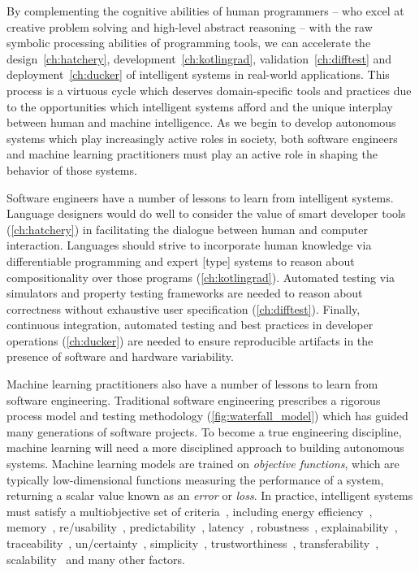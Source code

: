 By complementing the cognitive abilities of human programmers -- who excel at creative problem solving and high-level abstract reasoning -- with the raw symbolic processing abilities of programming tools, we can accelerate the design~\autoref{ch:hatchery}, development~\autoref{ch:kotlingrad}, validation~\autoref{ch:difftest} and deployment~\autoref{ch:ducker} of intelligent systems in real-world applications. This process is a virtuous cycle which deserves domain-specific tools and practices due to the opportunities which intelligent systems afford and the unique interplay between human and machine intelligence. As we begin to develop autonomous systems which play increasingly active roles in society, both software engineers and machine learning practitioners must play an active role in shaping the behavior of those systems.

Software engineers have a number of lessons to learn from intelligent systems. Language designers would do well to consider the value of smart developer tools (\autoref{ch:hatchery}) in facilitating the dialogue between human and computer interaction. Languages should strive to incorporate human knowledge via differentiable programming and expert [type] systems to reason about compositionality over those programs (\autoref{ch:kotlingrad}). Automated testing via simulators and property testing frameworks are needed to reason about correctness without exhaustive user specification (\autoref{ch:difftest}). Finally, continuous integration, automated testing and best practices in developer operations (\autoref{ch:ducker}) are needed to ensure reproducible artifacts in the presence of software and hardware variability.

Machine learning practitioners also have a number of lessons to learn from software engineering. Traditional software engineering prescribes a rigorous process model and testing methodology (\autoref{fig:waterfall_model}) which has guided many generations of software projects. To become a true engineering discipline, machine learning will need a more disciplined approach to building autonomous systems. Machine learning models are trained on \textit{objective functions}, which are typically low-dimensional functions measuring the performance of a system, returning a scalar value known as an \textit{error} or \textit{loss}. In practice, intelligent systems must satisfy a multiobjective set of criteria~\citep{censi2015mathematical}, including energy efficiency~\citep{paull2010novel}, memory~\citep{memory2013mitliagkas}, re/usability~\citep{breuleux2017automatic,deleu2019torchmeta}, predictability~\citep{turner2017well}, latency~\citep{ravanelli2018twin}, robustness~\citep{pineau2003policy}, explainability~\citep{turner2016model}, traceability~\citep{guo2017semantically, tsirigotis2018orion}, un/certainty~\citep{diaz2018interactive}, simplicity~\citep{kastner2019representation}, trustworthiness~\citep{xu2017efficient}, transferability~\citep{mehta2019active}, scalability~\citep{luan2019break} and many other factors.


